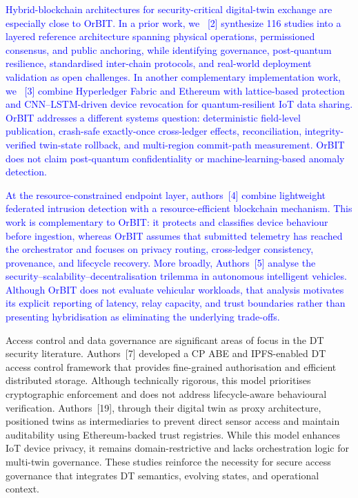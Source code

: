 \documentclass[11pt]{article}
\newcounter{reviewer}
\newcounter{point}[reviewer]
\begin{document}
\textcolor{blue}{Hybrid-blockchain architectures for security-critical digital-twin exchange are especially close to OrBIT. In a prior work, we ~[2] synthesize 116 studies into a layered reference architecture spanning physical operations, permissioned consensus, and public anchoring, while identifying governance, post-quantum resilience, standardised inter-chain protocols, and real-world deployment validation as open challenges. In another complementary implementation work, we ~[3] combine Hyperledger Fabric and Ethereum with lattice-based protection and CNN--LSTM-driven device revocation for quantum-resilient IoT data sharing. OrBIT addresses a different systems question: deterministic field-level publication, crash-safe exactly-once cross-ledger effects, reconciliation, integrity-verified twin-state rollback, and multi-region commit-path measurement. OrBIT does not claim post-quantum confidentiality or machine-learning-based anomaly detection.}

\textcolor{blue}{At the resource-constrained endpoint layer, authors~[4] combine lightweight federated intrusion detection with a resource-efficient blockchain mechanism. This work is complementary to OrBIT: it protects and classifies device behaviour before ingestion, whereas OrBIT assumes that submitted telemetry has reached the orchestrator and focuses on privacy routing, cross-ledger consistency, provenance, and lifecycle recovery. More broadly, Authors~[5] analyse the security--scalability--decentralisation trilemma in autonomous intelligent vehicles. Although OrBIT does not evaluate vehicular workloads, that analysis motivates its explicit reporting of latency, relay capacity, and trust boundaries rather than presenting hybridisation as eliminating the underlying trade-offs.}

Access control and data governance are significant areas of focus in the DT security literature. Authors~[7] developed a CP ABE  and IPFS-enabled DT access control framework that provides fine-grained authorisation and efficient distributed storage. Although technically rigorous, this model prioritises cryptographic enforcement and does not address lifecycle-aware behavioural verification. Authors~[19], through their digital twin as proxy architecture, positioned twins as intermediaries to prevent direct sensor access and maintain auditability using Ethereum-backed trust registries. While this model enhances IoT device privacy, it remains domain-restrictive and lacks orchestration logic for multi-twin governance. These studies reinforce the necessity for secure access governance that integrates DT semantics, evolving states, and operational context.
\end{document}
